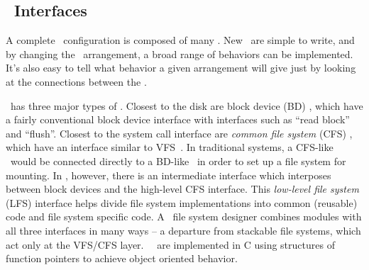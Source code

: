 \subsection {\Module\ Interfaces}
\label{sec:design:interfaces}

A complete \Kudos\ configuration is composed of many \modules. 
New \modules\ are simple to write, and
by
changing the \module\ arrangement, a broad range of behaviors can be
implemented.
%
It's also easy to tell what behavior a given arrangement will
give just by looking at the connections between the \modules.

\Kudos\ has three major types of \modules.
%
Closest to the disk are block device
(BD) \modules, which have a fairly conventional block device
interface with interfaces such as ``read block'' and ``flush''. 
%
Closest to the system call interface are
\emph{common file system} (CFS) \modules, which have an interface similar to
VFS~\cite{kleiman86vnodes}. 
%
In traditional systems, a CFS-like \module\ would be
connected directly to a BD-like \module\ in order to set up a file system for
mounting.
%
In \Kudos, however, there is an intermediate interface which interposes
between block devices and the high-level CFS interface.
%
This \emph{low-level file system} (LFS) interface helps divide
file system implementations into common (reusable) code and file system
specific code. A \Kudos\ file system designer combines modules with all
three interfaces in many ways -- a departure from stackable file systems,
which act only at the VFS/CFS layer. \Kudos\ \modules\ are implemented in C
using structures of function pointers to achieve object oriented behavior.

